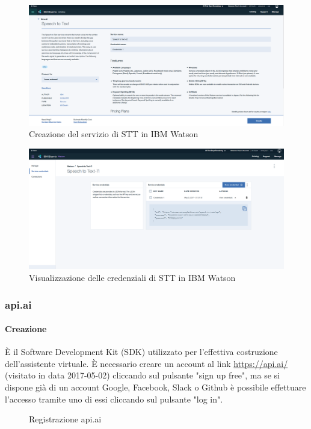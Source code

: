 \begin{figure}[h]
	\centerline{\includegraphics[width=1\textwidth,height=\textheight,keepaspectratio]{sezioni/images/watson-create.PNG}}
	\caption{Creazione del servizio di STT in IBM Watson}\label{fig:serviceWatson}
\end{figure}
\begin{figure}[h]
	\centerline{\includegraphics[width=1\textwidth,height=\textheight,keepaspectratio]{sezioni/images/watson-credentials.PNG}}
	\caption{Visualizzazione delle credenziali di STT in IBM Watson}\label{fig:credentialsWatson}
\end{figure}
\newpage
\subsubsection{api.ai}
\paragraph{Creazione}
È il Software Development Kit (SDK) utilizzato per l'effettiva costruzione dell'assistente virtuale.
È necessario creare un account al link \url{https://api.ai/} (visitato in data 2017-05-02) cliccando sul pulsante "sign up free", ma se si dispone già di un account Google, Facebook, Slack o Github è possibile effettuare l'accesso tramite uno di essi cliccando sul pulsante "log in".
\begin{figure}[h]
	\caption{Registrazione api.ai}
\end{figure}
